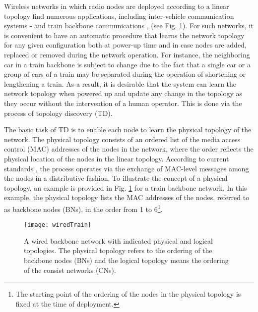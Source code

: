 \documentclass[10pt,english,two column]{IEEEtran}
\begin{document}
Wireless networks in which radio nodes are deployed according to a
linear topology find numerous applications, including inter-vehicle
communication systems \cite{Kesting}-\cite{CHen} and train backbone
communications \cite{Ning}, \cite{IEC 61375} (see Fig. \ref{fig. wiredTrain}).
For such networks, it is convenient to have an automatic procedure
that learns the network topology for any given configuration both
at power-up time and in case nodes are added, replaced or removed
during the network operation. For instance, the neighboring car in
a train backbone is subject to change due to the fact that a single
car or a group of cars of a train may be separated during the operation
of shortening or lengthening a train. As a result, it is desirable
that the system can learn the network topology when powered up and
update any change in the topology as they occur without the intervention
of a human operator. This is done via the process of topology discovery
(TD).

The basic task of TD is to enable each node to learn the physical
topology of the network. The physical topology consists of an ordered
list of the media access control (MAC) addresses of the nodes in the
network, where the order reflects the physical location of the nodes
in the linear topology. According to current standards \cite{IEC 61375},
the process operates via the exchange of MAC-level messages among
the nodes in a distributive fashion. To illustrate the concept of
a physical topology, an example is provided in Fig. \ref{fig. wiredTrain}
for a train backbone network. In this example, the physical topology
lists the MAC addresses of the nodes, referred to as backbone nodes
(BNs), in the order from 1 to 6\footnote{The starting point of the ordering of the nodes in the physical topology
is fixed at the time of deployment.}. 
\begin{figure}[htbp]
\begin{centering}
\textsf{\texttt{[image: wiredTrain]}}
\par\end{centering}

\caption{\label{fig. wiredTrain} A wired backbone network with indicated physical
and logical topologies. The physical topology refers to the ordering
of the backbone nodes (BNs) and the logical topology means the ordering
of the consist networks (CNs).}
\end{figure}
\end{document}
